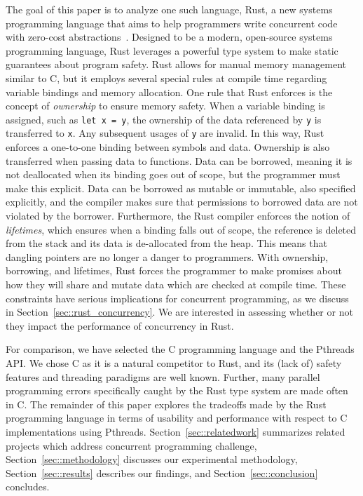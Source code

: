 The goal of this paper is to analyze one such language, Rust, a new systems programming language that aims to help programmers write concurrent code with zero-cost abstractions~\cite{rust-lang}. Designed to be a modern, open-source systems programming language, Rust leverages a powerful type system to make static guarantees about program safety. Rust allows for manual memory management similar to C, but it employs several special rules at compile time regarding variable bindings and memory allocation. One rule that Rust enforces is the concept of \textit{ownership} to ensure memory safety. When a variable binding is assigned, such as \texttt{let x = y}, the ownership of the data referenced by \texttt{y} is transferred to \texttt{x}. Any subsequent usages of \texttt{y} are invalid. In this way, Rust enforces a one-to-one binding between symbols and data. Ownership is also transferred when passing data to functions. Data can be borrowed, meaning it is not deallocated when its binding goes out of scope, but the programmer must make this explicit. Data can be borrowed as mutable or immutable, also specified explicitly, and the compiler makes sure that permissions to borrowed data are not violated by the borrower. Furthermore, the Rust compiler enforces the notion of \textit{lifetimes}, which ensures when a binding falls out of scope, the reference is deleted from the stack and its data is de-allocated from the heap. This means that dangling pointers are no longer a danger to programmers. With ownership, borrowing, and lifetimes, Rust forces the programmer to make promises about how they will share and mutate data which are checked at compile time. These constraints have serious implications for concurrent programming, as we discuss in Section~\ref{sec::rust_concurrency}. We are interested in assessing whether or not they impact the performance of concurrency in Rust.

For comparison, we have selected the C programming language and the Pthreads API. We chose C as it is a natural competitor to Rust, and its (lack of) safety features and threading paradigms are well known. Further, many parallel programming errors specifically caught by the Rust type system are made often in C.
The remainder of this paper explores the tradeoffs made by the Rust programming language in terms of usability and performance with respect to C implementations using Pthreads. Section~\ref{sec::relatedwork} summarizes related projects which address concurrent programming challenge, Section~\ref{sec::methodology} discusses our experimental methodology, Section~\ref{sec::results} describes our findings, and Section~\ref{sec::conclusion} concludes.
